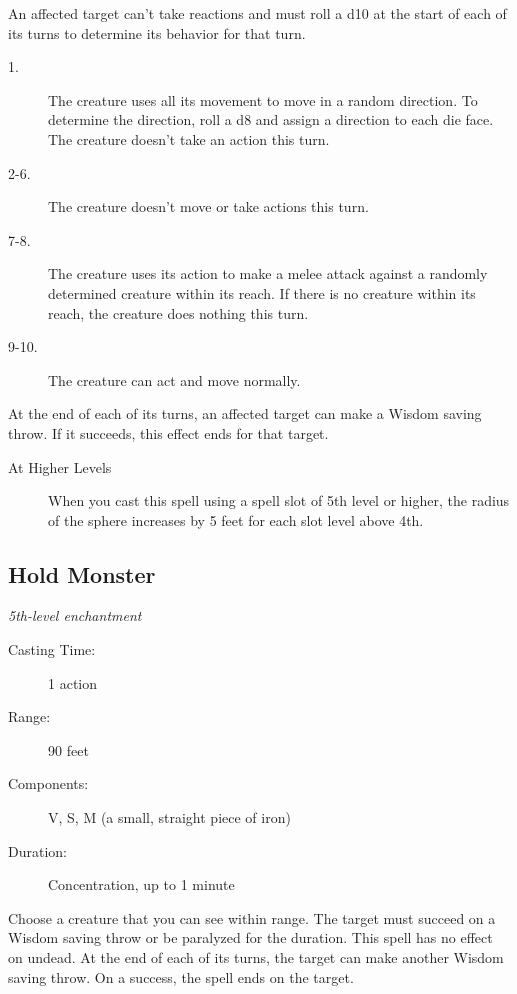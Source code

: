 \documentclass[letterpaper,10pt,twoside,twocolumn,openany]{book}
\begin{document}
An affected target can't take reactions and must roll a d10 at the start of each of its turns to determine its behavior for that turn. 

\begin{description}
	\item[1.] The creature uses all its movement to move in a random direction. To determine the direction, roll a d8 and assign a direction to each die face. The creature doesn't take an action this turn.
	\item[2-6.] The creature doesn't move or take actions this turn.
	\item[7-8.] The creature uses its action to make a melee attack against a randomly determined creature within its reach. If there is no creature within its reach, the creature does nothing this turn.
	\item[9-10.] The creature can act and move normally.
\end{description}

At the end of each of its turns, an affected target can make a Wisdom saving throw. If it succeeds, this effect ends for that target. 

\begin{description}
	\item[At Higher Levels] When you cast this spell using a spell slot of 5th level or higher, the radius of the sphere increases by 5 feet for each slot level above 4th.
\end{description}

\subsection{Hold Monster} \hypertarget{Hold Monster}{}
\begin{hangingpar}
	\textit{5th-level enchantment}
\end{hangingpar}
\begin{description}
	\item[Casting Time:] 1 action
	\item[Range:] 90 feet
	\item[Components:] V, S, M (a small, straight piece of iron) 
	\item[Duration:] Concentration, up to 1 minute 
\end{description}

Choose a creature that you can see within range. The target must succeed on a Wisdom saving throw or be paralyzed for the duration. This spell has no effect on undead. At the end of each of its turns, the target can make another Wisdom saving throw. On a success, the spell ends on the target.
\end{document}
